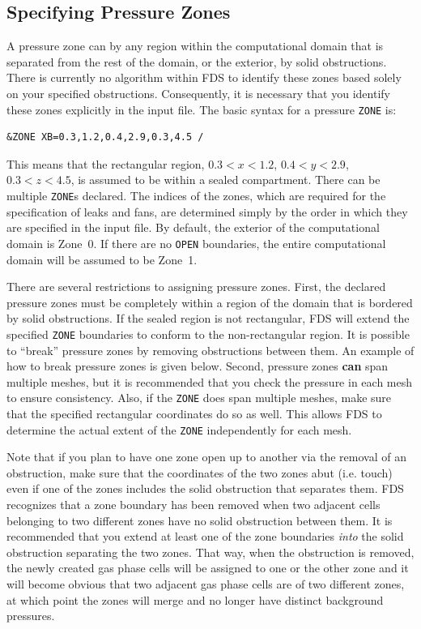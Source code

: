 \documentclass[11pt]{book}
\newcommand{\ct}{\tt\small}
\begin{document}
\subsection{Specifying Pressure Zones}
\label{info:ZONE_Basics}

A pressure zone can by any region within the computational domain that is separated from the rest of the domain, or the exterior,
by solid obstructions. There is currently no algorithm within FDS to identify these zones based solely on your specified obstructions. Consequently, it is
necessary that you identify these zones explicitly in the input file. The basic syntax for a pressure {\ct ZONE} is:

\footnotesize
\begin{verbatim}
&ZONE XB=0.3,1.2,0.4,2.9,0.3,4.5 /
\end{verbatim}
\normalsize

\noindent
This means that the rectangular region, $0.3<x<1.2$, $0.4<y<2.9$, $0.3<z<4.5$, is assumed to be within a sealed compartment. There can be multiple {\ct ZONE}s
declared. The indices of the zones, which are required for the specification of leaks and fans, are determined simply by the order in which they are specified in the input file.
By default, the exterior of the computational
domain is Zone~0. If there are no {\ct OPEN} boundaries, the entire computational domain will be assumed to be Zone~1.

There are several restrictions to assigning pressure zones. First, the declared pressure zones must be completely within a region of the
domain that is bordered by solid obstructions. If the sealed region is not rectangular, FDS will extend the specified {\ct ZONE} boundaries to
conform to the non-rectangular region. It is possible to ``break'' pressure zones by removing
obstructions between them. An example of how to break pressure zones is given below.
Second, pressure zones {\bf can} span multiple meshes, but it is recommended that you check the pressure in each mesh to ensure consistency. Also, if the {\ct ZONE} does span multiple
meshes, make sure that the specified rectangular coordinates do so as well. This allows FDS to determine the actual extent of the {\ct ZONE} independently for each
mesh.

Note that if you plan to have one zone open up to another via the removal of an obstruction, make sure that the coordinates of the two
zones abut (i.e. touch) even if one of the zones includes the solid obstruction that separates them. FDS recognizes that a zone boundary has been removed when
two adjacent cells belonging to two different zones have no solid obstruction between them. It is recommended that you extend at least one
of the zone boundaries {\em into} the solid obstruction separating the two zones. That way, when the obstruction is removed, the newly created
gas phase cells will be assigned to one or the other zone and it will become obvious that two adjacent gas phase cells are of two different zones, at
which point the zones will merge and no longer have distinct background pressures.
\end{document}
